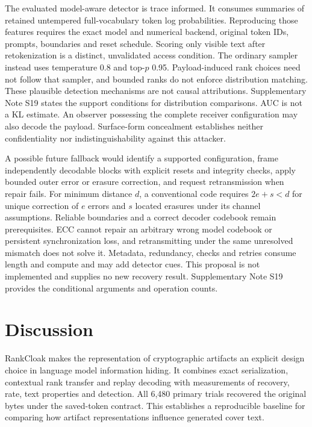 \documentclass[fleqn,10pt]{wlscirep}
\begin{document}
The evaluated model-aware detector is trace informed. It consumes summaries of retained untempered full-vocabulary token log probabilities. Reproducing those features requires the exact model and numerical backend, original token IDs, prompts, boundaries and reset schedule. Scoring only visible text after retokenization is a distinct, unvalidated access condition. The ordinary sampler instead uses temperature 0.8 and top-\(p\) 0.95. Payload-induced rank choices need not follow that sampler, and bounded ranks do not enforce distribution matching. These plausible detection mechanisms are not causal attributions. Supplementary Note S19 states the support conditions for distribution comparisons. AUC is not a KL estimate. An observer possessing the complete receiver configuration may also decode the payload. Surface-form concealment establishes neither confidentiality nor indistinguishability against this attacker.

A possible future fallback would identify a supported configuration, frame independently decodable blocks with explicit resets and integrity checks, apply bounded outer error or erasure correction, and request retransmission when repair fails. For minimum distance \(d\), a conventional code requires \(2e+s<d\) for unique correction of \(e\) errors and \(s\) located erasures under its channel assumptions. Reliable boundaries and a correct decoder codebook remain prerequisites. ECC cannot repair an arbitrary wrong model codebook or persistent synchronization loss, and retransmitting under the same unresolved mismatch does not solve it. Metadata, redundancy, checks and retries consume length and compute and may add detector cues. This proposal is not implemented and supplies no new recovery result. Supplementary Note S19 provides the conditional arguments and operation counts.

\section*{Discussion}\label{sec:discussion}

RankCloak makes the representation of cryptographic artifacts an explicit design choice in language model information hiding. It combines exact serialization, contextual rank transfer and replay decoding with measurements of recovery, rate, text properties and detection. All 6,480 primary trials recovered the original bytes under the saved-token contract. This establishes a reproducible baseline for comparing how artifact representations influence generated cover text.
\end{document}
